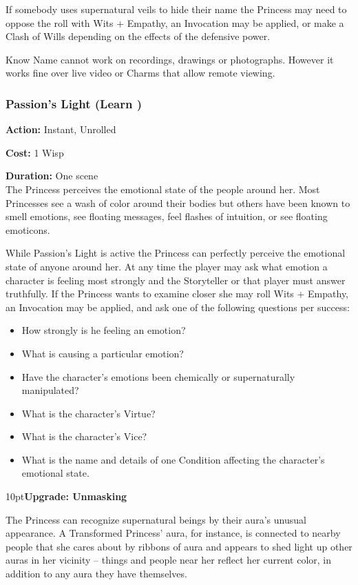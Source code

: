 If somebody uses supernatural veils to hide their name the Princess may need to oppose the roll with Wits + Empathy, an Invocation may be applied, or make a Clash of Wills depending on the effects of the defensive power.

Know Name cannot work on recordings, drawings or photographs. However it works fine over live video or Charms that allow remote viewing. 

\subsubsection*{Passion's Light (Learn \textbullet)}

\noindent \textbf{Action:} Instant, Unrolled

\noindent \textbf{Cost:} 1 Wisp

\noindent \textbf{Duration:} One scene \\

\noindent The Princess perceives the emotional state of the people around her. Most Princesses see a wash of color around their bodies but others have been known to smell emotions, see floating messages, feel flashes of intuition, or see floating emoticons. 

While Passion's Light is active the Princess can perfectly perceive the emotional state of anyone around her. At any time the player may ask what emotion a character is feeling most strongly and the Storyteller or that player must answer truthfully. If the Princess wants to examine closer she may roll Wits + Empathy, an Invocation may be applied, and ask one of the following questions per success: 

\begin{itemize}
 \item How strongly is he feeling an emotion? 
 \item What is causing a particular emotion? 
 \item Have the character’s emotions been chemically or supernaturally manipulated? 
 \item What is the character’s Virtue?
 \item What is the character’s Vice?
 \item What is the name and details of one Condition affecting the character’s emotional state. 
\end{itemize}

\begin{myindentpar}{10pt}\textbf{Upgrade: Unmasking}

The Princess can recognize supernatural beings by their aura's unusual appearance. A Transformed Princess' aura, for instance, is connected to nearby people that she cares about by ribbons of aura and appears to shed light up other auras in her vicinity -- things and people near her reflect her current color, in addition to any aura they have themselves. \end{myindentpar}

